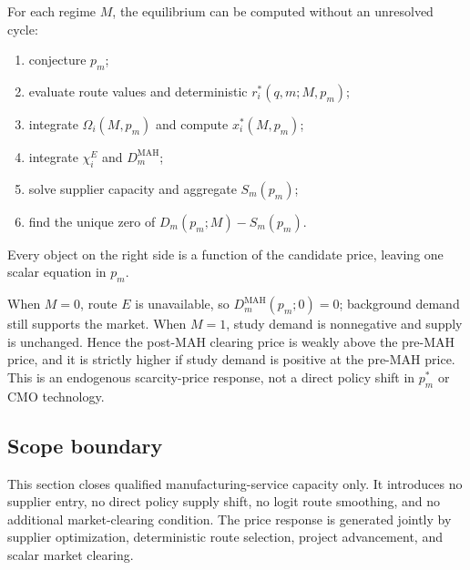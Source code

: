 For each regime \(M\), the equilibrium can be computed without an unresolved
cycle:
\begin{enumerate}
  \item conjecture \(p_m\);
  \item evaluate route values and deterministic
  \(r_i^*(q,m;M,p_m)\);
  \item integrate \(\Omega_i(M,p_m)\) and compute \(x_i^*(M,p_m)\);
  \item integrate \(\chi_i^E\) and \(D_m^{\mathrm{MAH}}\);
  \item solve supplier capacity and aggregate \(S_m(p_m)\);
  \item find the unique zero of \(D_m(p_m;M)-S_m(p_m)\).
\end{enumerate}
Every object on the right side is a function of the candidate price, leaving
one scalar equation in \(p_m\).

When \(M=0\), route \(E\) is unavailable, so
\(D_m^{\mathrm{MAH}}(p_m;0)=0\); background demand still supports the market.
When \(M=1\), study demand is nonnegative and supply is unchanged. Hence the
post-MAH clearing price is weakly above the pre-MAH price, and it is strictly
higher if study demand is positive at the pre-MAH price. This is an endogenous
scarcity-price response, not a direct policy shift in \(p_m^*\) or CMO
technology.

\subsection{Scope boundary}
\label{subsec:p06-scope}

This section closes qualified manufacturing-service capacity only. It introduces
no supplier entry, no direct policy supply shift, no logit route smoothing,
and no additional market-clearing condition. The price response is generated
jointly by supplier optimization, deterministic route selection, project
advancement, and scalar market clearing.
